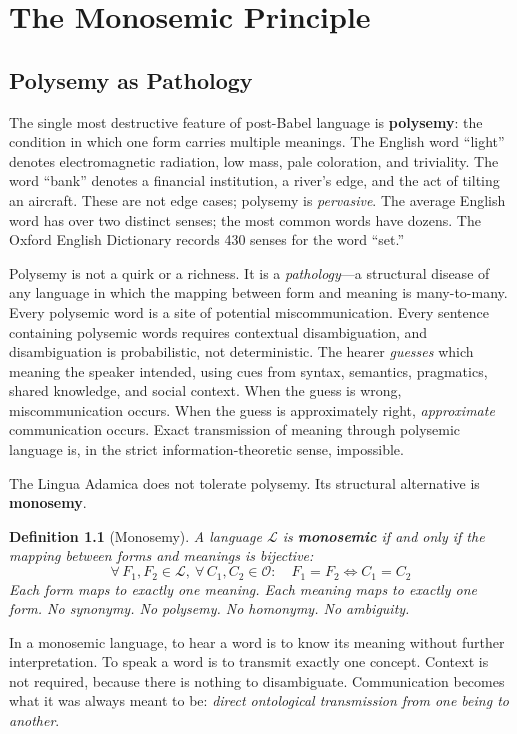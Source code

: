 \documentclass[12pt, letterpaper]{book}
\def\equiv{=}%
\newtheorem{definition}{Definition}[chapter]
\begin{document}
\chapter{The Monosemic Principle}

\section{Polysemy as Pathology}

The single most destructive feature of post-Babel language is \textbf{polysemy}: the condition in which one form carries multiple meanings. The English word ``light'' denotes electromagnetic radiation, low mass, pale coloration, and triviality. The word ``bank'' denotes a financial institution, a river's edge, and the act of tilting an aircraft. These are not edge cases; polysemy is \textit{pervasive}. The average English word has over two distinct senses; the most common words have dozens. The Oxford English Dictionary records 430 senses for the word ``set.''

Polysemy is not a quirk or a richness. It is a \textit{pathology}---a structural disease of any language in which the mapping between form and meaning is many-to-many. Every polysemic word is a site of potential miscommunication. Every sentence containing polysemic words requires contextual disambiguation, and disambiguation is probabilistic, not deterministic. The hearer \textit{guesses} which meaning the speaker intended, using cues from syntax, semantics, pragmatics, shared knowledge, and social context. When the guess is wrong, miscommunication occurs. When the guess is approximately right, \textit{approximate} communication occurs. Exact transmission of meaning through polysemic language is, in the strict information-theoretic sense, impossible.

The Lingua Adamica does not tolerate polysemy. Its structural alternative is \textbf{monosemy}.

\begin{definition}[Monosemy]\label{def:monosemy}
A language $\mathcal{L}$ is \textbf{monosemic} if and only if the mapping between forms and meanings is bijective:
\[
\forall\, F_1, F_2 \in \mathcal{L},\ \forall\, C_1, C_2 \in \mathcal{O}: \quad F_1 \equiv F_2 \iff C_1 \equiv C_2
\]
Each form maps to exactly one meaning. Each meaning maps to exactly one form. No synonymy. No polysemy. No homonymy. No ambiguity.
\end{definition}

In a monosemic language, to hear a word is to know its meaning without further interpretation. To speak a word is to transmit exactly one concept. Context is not required, because there is nothing to disambiguate. Communication becomes what it was always meant to be: \textit{direct ontological transmission from one being to another}.
\end{document}
